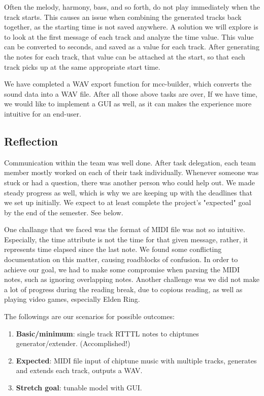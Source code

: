 \documentclass{article}
\begin{document}
Often the melody, harmony, bass, and so forth, do not play immediately when the track starts. This causes an issue when combining the generated tracks back together, as the 
starting time is not saved anywhere. A solution we will explore is to look at the first message of each track and analyze the time value. This value can be converted to 
seconds, and saved as a value for each track. After generating the notes for each track, that value can be attached at the start, so that each track picks up at the same 
appropriate start time. 

We have completed a WAV export function for mcc-builder, which converts the sound data into a WAV file. After all those above tasks are over, If we have time, we would like 
to implement a GUI as well, as it can makes the experience more intuitive for an end-user. 

\subsection{Reflection}
Communication within the team was well done. After task delegation, each team member mostly worked on each of their task individually. Whenever someone was stuck or had 
a question, there was another person who could help out. We made steady progress as well, which is why we are keeping up with the deadlines that we set up initially. We 
expect to at least complete the project's "expected" goal by the end of the semester. See below.

One challange that we faced was the format of MIDI file was not so intuitive. Especially, the time attribute is not the time for that given message, rather, it represents 
time elapsed since the last note. We found some conflicting documentation on this matter, causing roadblocks of confusion. In order to achieve our goal, we had to make some 
compromise when parsing the MIDI notes, such as ignoring overlapping notes. Another challenge was we did not make a lot of progress during the reading break, due to 
copious reading, as well as playing video games, especially Elden Ring.

The followings are our scenarios for possible outcomes:
\begin{enumerate}
  \item \textbf{Basic/minimum}: single track RTTTL notes to chiptunes generator/extender. (Accomplished!)
  \item \textbf{Expected}: MIDI file input of chiptune music with multiple tracks, generates and extends each track, outputs a WAV.
  \item \textbf{Stretch goal}: tunable model with GUI.
\end{enumerate}
\end{document}
